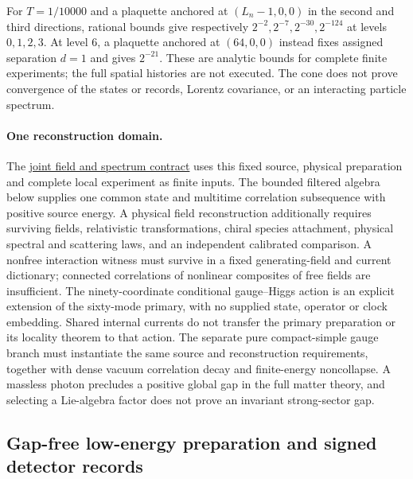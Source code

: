 For $T=1/10000$ and a plaquette anchored at $(L_n-1,0,0)$ in the second
and third directions, rational bounds give respectively
$2^{-2},2^{-7},2^{-30},2^{-124}$ at levels $0,1,2,3$. At level $6$, a
plaquette anchored at $(64,0,0)$ instead fixes assigned separation $d=1$
and gives $2^{-21}$. These are analytic bounds for complete finite
experiments; the full spatial histories are not executed. The cone does
not prove convergence of the states or records, Lorentz covariance, or
an interacting particle spectrum.

\paragraph{One reconstruction domain.}
The \href{https://github.com/FloatingPragma/observer-patch-holography/blob/main/model/particle_joint_reconstruction/DEPENDENCIES.md}{joint field and spectrum contract}
uses this fixed source, physical preparation and complete local experiment
as finite inputs. The bounded filtered algebra below supplies one common
state and multitime correlation subsequence with positive source energy.
A physical field reconstruction additionally requires surviving fields,
relativistic transformations, chiral species attachment, physical spectral
and scattering laws, and an independent calibrated comparison. A nonfree
interaction witness must survive in a fixed generating-field and current
dictionary; connected correlations of nonlinear composites of free fields
are insufficient. The ninety-coordinate conditional gauge--Higgs action
is an explicit extension of the sixty-mode primary, with no supplied
state, operator or clock embedding. Shared internal currents do not
transfer the primary preparation or its locality theorem to that action.
The separate pure compact-simple gauge branch must instantiate the same
source and reconstruction requirements, together with dense vacuum
correlation decay and finite-energy noncollapse. A massless photon
precludes a positive global gap in the full matter theory, and selecting
a Lie-algebra factor does not prove an invariant strong-sector gap.

\subsection{Gap-free low-energy preparation and signed detector records}

